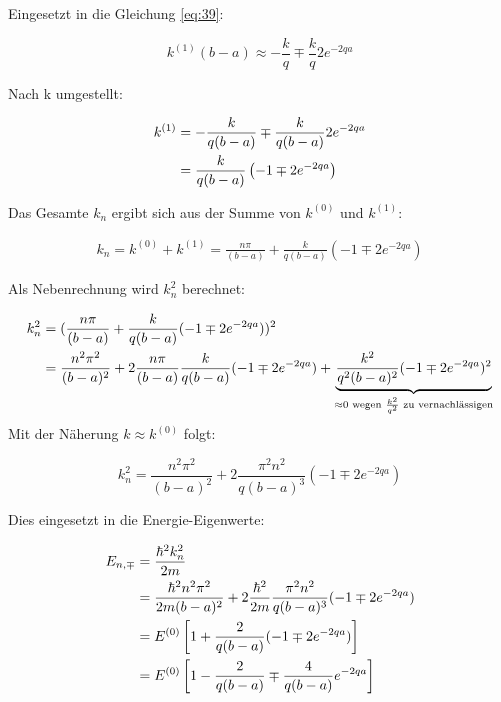 Eingesetzt in die Gleichung \eqref{eq:39}:

\begin{equation}
  \label{eq:41}
    k^{(1)}(b-a) \approx - \frac{k}{q} \mp \frac{k}{q} 2e^{-2qa}
\end{equation}

Nach k umgestellt:

\begin{align}
  \label{eq:42}
  k^{(1)} &= - \frac{k}{q(b-a)} \mp \frac{k}{q(b-a)} 2e^{-2qa} \notag \\
&= \frac{k}{q(b-a)}\left( -1 \mp  2e^{-2qa}\right)
\end{align}

Das Gesamte \(k_n\) ergibt sich aus der Summe von \(k^{(0)}\) und \(k^{(1)}\):

\begin{align}
  \label{eq:43}
  k_n = k^{(0)}+k^{(1)} = \frac{n\pi}{(b-a)} + \frac{k}{q(b-a)}( -1 \mp  2e^{-2qa})
\end{align}

Als Nebenrechnung wird \(k_n^2\) berechnet:

\begin{align}
  \label{eq:44}
  k_n^2 &= (\frac{n\pi}{(b-a)} + \frac{k}{q(b-a)}( -1 \mp  2e^{-2qa}))^2  \notag\\
&=\frac{n^2\pi^2}{(b-a)^2} + 2\frac{n\pi}{(b-a)} \frac{k}{q(b-a)}( -1 \mp  2e^{-2qa}) + \underbrace{\frac{k^2}{q^2(b-a)^2}( -1 \mp  2e^{-2qa})^2}_{\approx 0 \text{ wegen } \frac{k^2}{q^2} \text{ zu vernachlässigen}}
\end{align}
Mit der Näherung \(k \approx k^{(0)}\) folgt:

\begin{equation}
  k_n^2 =\frac{n^2\pi^2}{(b-a)^2} + 2\frac{\pi^2 n^2}{q(b-a)^3}( -1 \mp  2e^{-2qa})\label{eq:45}
\end{equation}

Dies eingesetzt in die Energie-Eigenwerte:

\begin{align}
  \label{eq:46}
  E_{n,\mp} &= \frac{\hbar^2 k_n^2}{2m} \notag\\
&=  \frac{\hbar^2 n^2\pi^2}{2m(b-a)^2} + 2\frac{\hbar^2 }{2m}\frac{\pi^2 n^2}{q(b-a)^3}( -1 \mp  2e^{-2qa})  \notag\\
&= E^{(0)}\left[1+\frac{2}{q(b-a)}( -1 \mp  2e^{-2qa})  \right] \notag \\
&= E^{(0)}\left[1-\frac{2}{q(b-a)} \mp \frac{4}{q(b-a)}e^{-2qa}  \right]
\end{align}


